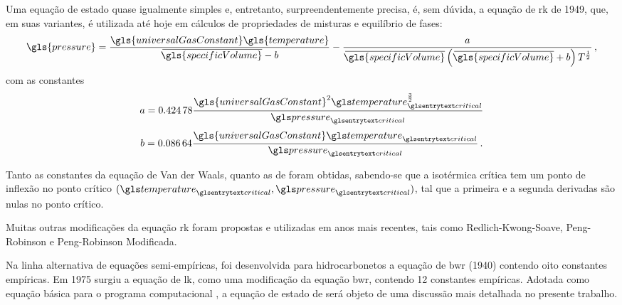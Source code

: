     Uma equação de estado quase igualmente simples e, entretanto,
    surpreendentemente precisa, é, sem dúvida, a equação de \gls{rk} de 1949,
    que, em suas variantes, é utilizada até hoje em cálculos de propriedades de
    misturas e equilíbrio de fases:
    \begin{equation} \label{eq:1.14}
        \gls{pressure}
        =
        \frac{
            \gls{universalGasConstant}
            \gls{temperature}
        }{
            \molar{\gls{specificVolume}}
            -
            b
        }
        -
        \frac{
            a
        }{
            \molar{\gls{specificVolume}}
            \left(
                \molar{\gls{specificVolume}}
                +
                b
            \right)
            T^{\frac{1}{2}}
        }\,,
    \end{equation}
    com as constantes
    \begin{equation} \label{eq:1.15}
        a
        =
        \num{0.42478}
        \frac{
            \gls{universalGasConstant}^2
            \gsub{temperature}{critical}^{\frac{3}{2}}
        }{
            \gsub{pressure}{critical}
        }
    \end{equation}
	\begin{equation} \label{eq:1.16}
        b
        =
        \num{0.08664}
        \frac{
            \gls{universalGasConstant}
            \gsub{temperature}{critical}
        }{
            \gsub{pressure}{critical}
        }\,.
    \end{equation}

    Tanto as constantes da equação de Van der Waals, quanto as de
     foram obtidas, sabendo-se que a isotérmica crítica
     tem um ponto de inflexão no ponto crítico
    $(\gsub{temperature}{critical},\gsub{pressure}{critical})$, tal que a
    primeira e a segunda derivadas são nulas no ponto crítico.

    Muitas outras modificações da equação \gls{rk} foram propostas e utilizadas
    em anos mais recentes, tais como Redlich-Kwong-Soave, Peng-Robinson e
    Peng-Robinson Modificada.

    Na linha alternativa de equações semi-empíricas, foi desenvolvida para
    hidrocarbonetos a equação de \gls{bwr} (1940) contendo oito constantes
    empíricas. Em 1975 surgiu a equação de \gls{lk}, como uma modificação da
    equação \gls{bwr}, contendo 12 constantes empíricas. Adotada como equação
    básica para o programa computacional {}, a equação de
    estado de  será objeto de uma discussão mais detalhada no
    presente trabalho.


